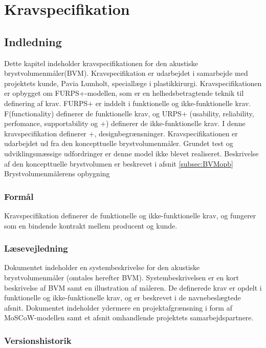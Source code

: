 
\chapter{Kravspecifikation}
\label{Kravspec}
	\section{Indledning}
	Dette kapitel indeholder kravspecifikationen for den akustiske brystvolumenmåler(BVM). Kravspecifikation er udarbejdet i samarbejde med projektets kunde, Pavia Lumholt, speciallæge i plastikkirurgi. 
	Kravspecifikationen er opbygget om FURPS+-modellen, som er en helhedsbetragtende teknik til definering af krav.
	FURPS+ er inddelt i funktionelle og ikke-funktionelle krav. F(functionality) definerer de funktionelle krav, og URPS+ (usability, reliability, perfomance, supportability og +) definerer de ikke-funktionelle krav. I denne kravspecifikation definerer +, designbegrænsninger.  
Kravspecifikationen er udarbejdet ud fra den koncepttuelle brystvolumenmåler. Grundet test og udviklingsmæssige udfordringer er denne model ikke blevet realiseret. Beskrivelse af den koncepttuelle brystvolumen er beskrevet i afsnit \ref{subsec:BVMopb} Brystvolumenmålerens opbygning 
		  
		\subsection{Formål}
		Kravspecifikation definerer de funktionelle og ikke-funktionelle krav, og fungerer som en bindende kontrakt mellem producent og kunde.
	
		\subsection{Læsevejledning}	
		Dokumentet indeholder en systembeskrivelse for den akustiske brystvolumenmåler (omtales herefter BVM). Systembeskrivelsen er en kort beskrivelse af BVM samt en illustration af måleren. De definerede krav er opdelt i funktionelle og ikke-funktionelle krav, og er beskrevet i de navnebeslægtede afsnit. Dokumentet indeholder ydermere en projektafgrænsning i form af MoSCoW-modellen samt et afsnit omhandlende projektets samarbejdspartnere.
		
		\subsection{Versionshistorik}
		
		\vspace{5mm}
		
